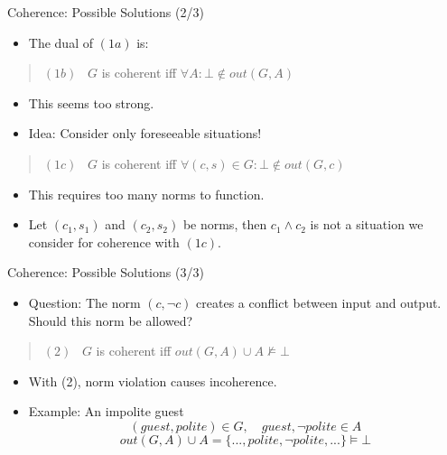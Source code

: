 \documentclass[]{beamer}
\begin{document}
\begin{frame}{Coherence: Possible Solutions (2/3)}
    \begin{itemize}
        \item The dual of $(1a)$ is:
    \end{itemize}
    \begin{quote}
        $(1b)$ \ $G$ is coherent \quad iff \quad $\forall A \colon \bot \not\in \mathit{out}(G,A)$
    \end{quote}
    \begin{itemize}
        \item This seems too strong.
        \pause
        \item Idea: Consider only foreseeable situations!
    \end{itemize}
    \begin{quote}
        $(1c)$ \ $G$ is coherent \quad iff \quad $\forall (c,s) \in G  \colon \bot \not\in \mathit{out}(G,c)$
    \end{quote}
    \pause
    \begin{itemize}
        \item This requires too many norms to function.
        \item Let $(c_1,s_1)$ and $(c_2,s_2)$ be norms, then $c_1 \land c_2$ is not a situation we consider for coherence with $(1c)$.
    \end{itemize}
\end{frame}

\begin{frame}{Coherence: Possible Solutions (3/3)}
    \begin{itemize}
        \item Question: The norm $(c,\neg c)$ creates a conflict between input and output. Should this norm be allowed?
    \end{itemize}
    \pause
    \begin{quote}
        $(2)$ \ $G$ is coherent \quad iff \quad $\mathit{out}(G,A) \cup A \not\models \bot$
    \end{quote}
    \pause
    \begin{itemize}
        \item With (2), norm violation causes incoherence.
        \item Example: An impolite guest
        \[(\mathit{guest}, \mathit{polite})\in G, \quad \mathit{guest}, \neg\mathit{polite} \in A\]
        \[\mathit{out}(G,A) \cup A = \{...,\mathit{polite},\neg\mathit{polite},...\} \models \bot\]
    \end{itemize}
\end{frame}
\end{document}
